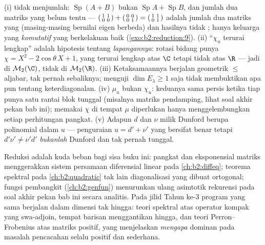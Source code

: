 \begin{remark}\label{rem:b2:reduction:pitfalls}
(i)  tidak menjumlah: $\operatorname{Sp}(A + B)$ bukan
$\operatorname{Sp}A + \operatorname{Sp}B$, dan jumlah dua matriks yang
 belum tentu  ---
$\begin{psmallmatrix}1 & 1\\ 0 & 0\end{psmallmatrix} +
\begin{psmallmatrix}0 & 0\\ 0 & 1\end{psmallmatrix} =
\begin{psmallmatrix}1 & 1\\ 0 & 1\end{psmallmatrix}$ adalah jumlah
dua matriks yang  (masing-masing bernilai eigen
berbeda) dan hasilnya tidak ; hanya keluarga yang
\emph{komutatif} yang berkelakuan baik
(\cref{exo:b2:reduction:9}). (ii) ``$\chi_u$ terurai lengkap'' adalah
hipotesis tentang \emph{lapangannya}: rotasi bidang punya $\chi =
X^2 - 2\cos\theta\,X + 1$, yang terurai lengkap atas $\C$ tetapi tidak
atas $\R$ --- jadi  di $\mathcal{M}_2(\C)$, tidak
 di $\mathcal{M}_2(\R)$. (iii) Ketaksamaannya
berjalan geometrik $\leq$ aljabar, tak pernah sebaliknya; menguji
$\dim E_\lambda \geq 1$ saja tidak membuktikan apa pun tentang
keterdiagonalan. (iv) $\mu_u$ bukan $\chi_u$: keduanya sama persis
ketika tiap  punya satu rantai blok tunggal (misalnya
matriks pendamping, lihat soal akhir pekan bab ini); memakai $\chi$ di
tempat $\mu$ diperlukan hanya menggelembungkan setiap perhitungan
pangkat. (v) Adapun $d$ dan $\nu$ milik Dunford berupa polinomial dalam
$u$ --- penguraian $u = d' + \nu'$ yang bersifat benar tetapi
$d'\nu' \neq \nu'd'$ \emph{bukanlah} Dunford dan tak pernah tunggal.
\end{remark}

\begin{remark}
Reduksi adalah kuda beban bagi sisa buku ini: pangkat dan
eksponensial matriks menggerakkan sistem persamaan diferensial linear
pada \cref{ch:b2:diffeq}; teorema spektral pada \cref{ch:b2:quadratic}
tak lain diagonalisasi yang dibuat ortogonal; fungsi pembangkit
(\cref{ch:b2:genfun}) menurunkan ulang asimtotik rekurensi pada soal
akhir pekan bab ini secara analitis. Pada jilid Tahun ke-3 program yang
sama berjalan dalam dimensi tak hingga: teori spektral atas
operator kompak yang swa-adjoin, tempat barisan  menggantikan
 hingga, dan teori Perron--Frobenius atas matriks positif, yang
menjelaskan \emph{mengapa}  dominan pada masalah pencacahan
selalu positif dan sederhana.
\end{remark}

